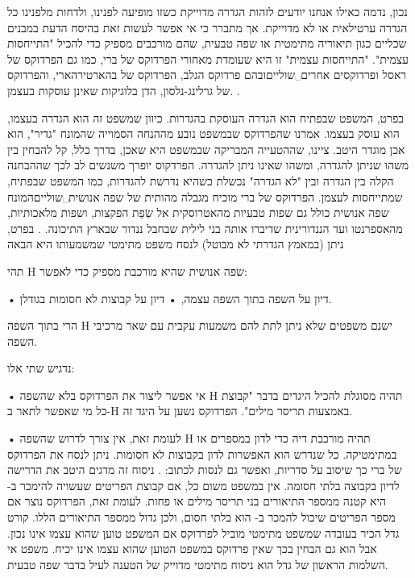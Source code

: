 נכון, נדמה כאילו אנחנו יודעים לזהות הגדרה מדוייקת כשזו מופיעה לפנינו, ולדחות
מלפנינו כל הגדרה ערטילאית או לא מדוייקת. אך מתברר כי אי אפשר לעשות זאת בהיסח
הדעת במבנים שכליים כגון תיאוריה מתימטית או שפה טבעית, שהם מורכבים מספיק כדי
להכיל "התייחסות עצמית". "התייחסות עצמית" זו היא שעומדת מאחורי הפרדוקס של ברי,
כמו גם הפרדוקס של ראסל  ופרדוקסים אחרים␣שוליים{ובהם פרדוקס הגלב, הפרדוקס של
בהארטירהארי, והפרדוקס של גרלינג-נלסון, הדן בלוגיקות שאינן עוסקות בעצמן. }.

בפרט, המשפט שבפתיח הוא הגדרה העוסקת בהגדרות. כיוון שמשפט זה הוא הגדרה בעצמו,
הוא עוסק בעצמו. אמרנו שהפרדוקס שבמשפט נובע מההנחה הסמוייה שהמונח "גדיר", הוא
אכן מוגדר היטב. ציינו, שההטעייה המבריקה שבמשפט היא שאכן, בדרך כלל, קל להבחין
בין משהו שניתן להגדרה, ומשהו שאינו ניתן להגדרה. הפרדקוס יופרך משנשים לב לכך
שההבחנה הקלה בין הגדרה ובין "לא הגדרה" נכשלת כשהיא נדרשת להגדרות, כמו המשפט
שבפתיח, שמתייחסות לעצמן. הפרדוקס של ברי מוכיח מגבלה מהותית של שפה
אנושית␣שוליים{המונח שפה אנושית כולל גם שפות טבעיות מהאטרוסקית אל שְׂפַת
הפקצות, ושפות מלאכותיות, מהאספרנטו ועד הננדורינית שדיברו אותה בני לילית שבחבל
ננדור שבארץ התיכונה. }. בפרט, ניתן (במאמץ הגדרתי לא מבוטל) לנסח משפט מתימטי
שמשמעותו היא הבאה

\begin{mybox}
תהי H שפה אנושית שהיא מורכבת מספיק כדי לאפשר:
\begin{itemize}
• דיון על השפה בתוך השפה עצמה,
• דיון על קבוצות לא חסומות בגודלן.
\end{itemize}
הרי בתוך השפה H ישנם משפטים שלא ניתן לתת להם משמעות עקבית עם שאר מרכיבי השפה.
\end{mybox}

נדגיש שתי אלו:
\begin{itemize}
• אי אפשר ליצור את הפרדוקס בלא שהשפה H תהיה מסוגלת להכיל היגדים בדבר "קבוצת כל
מי שאפשר לתאר ב-H באמצעות תריסר מילים". הפרדוקס נשען על היגד זה.

• לעומת זאת, אין צורך לדרוש שהשפה H תהיה מורכבת דיה כדי לדון במספרים או
במתימטיקה. כל שנדרש הוא האפשרות לדון בקבוצות לא חסומות. ניתן לנסח את הפרדוקס של
ברי כך שיסוב על סדריות, ואפשר גם לנסות לכתוב: . ניסוח זה מדגים היטב את
הדרישה לדיון בקבוצה בלתי חסומה. אין במשפט משום כל, אם קבוצת הפריטים שעשויה
להימכר ב- היא קטנה ממספר התיאורים בני תריסר מילים או פחות. לעומת זאת,
הפרדוקס נוצר אם מספר הפריטים שיכול להמכר ב- הוא בלתי חסום, ולכן גדול
ממספר התיאורים הללו. קורט גדל הכיר בעובדה שמשפט מתימטי מוביל לפרדוקס אם המשפט
טוען שהוא עצמו אינו נכון. אבל הוא גם הבחין בכך שאין פרדוקס במשפט הטוען שהוא
עצמו אינו יכיח. משפט אי השלמות הראשון של גדל הוא ניסוח מתימטי מדוייק של הטענה
לעיל בדבר שפה טבעית.

\end{itemize}

